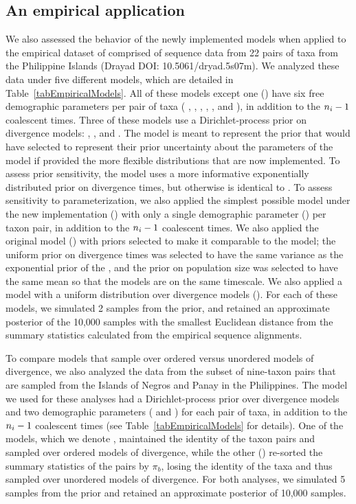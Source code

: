 \subsection*{An empirical application}
We also assessed the behavior of the newly implemented models when applied to
the empirical dataset of \citet{Oaks2012} comprised of sequence data from 22
pairs of taxa from the Philippine Islands (Drayad DOI: 10.5061/dryad.5s07m).
We analyzed these data under five different models, which are detailed in
Table~\ref{tabEmpiricalModels}.
All of these models except one (\empModelDPPSimple) have six free demographic
parameters per pair of taxa (
\ancestralTheta{},
,
,
\bottleTime{},
, and
),
in addition to the $\popSampleSize{i}{} - 1$ coalescent times.
Three of these models use a Dirichlet-process prior on divergence models:
\empModelDPP, \empModelDPPInform, and \empModelDPPSimple.
The \empModelDPP model is meant to represent the prior that \citet{Oaks2012}
would have selected to represent their prior uncertainty about the parameters
of the model if provided the more flexible distributions that are now
implemented.
To assess prior sensitivity, the \empModelDPPInform model uses a more
informative exponentially distributed prior on divergence times, but otherwise
is identical to \empModelDPP.
To assess sensitivity to parameterization, we also applied the simplest
possible model under the new implementation (\empModelDPPSimple) with only a
single demographic parameter (\myTheta{}) per taxon pair, in addition to the
$\popSampleSize{i}{} - 1$ coalescent times.
We also applied the original \msb model (\empModelOld) with priors
selected to make it comparable to the \empModelDPP model;
the uniform prior on divergence times was selected to have the same variance as
the exponential prior of the \empModelDPP, and the prior on population
size was selected to have the same mean so that the models are on the same
timescale.
We also applied a model with a uniform distribution over divergence models
(\empModelUniform).
For each of these models, we simulated 2 samples from the prior, and
retained an approximate posterior of the 10,000 samples with the smallest
Euclidean distance from the summary statistics calculated from the empirical
sequence alignments.

To compare models that sample over ordered versus unordered models of
divergence, we also analyzed the data from the subset of nine-taxon pairs that
are sampled from the Islands of Negros and Panay in the Philippines.
The model we used for these analyses had a Dirichlet-process prior over
divergence models and two demographic parameters (\ancestralTheta{} and
\descendantTheta{}{}) for each pair of taxa, in addition to the
$\popSampleSize{i}{} - 1$ coalescent times (see Table~\ref{tabEmpiricalModels}
for details).
One of the models, which we denote \npModelDPPOrdered, maintained the identity
of the taxon pairs and sampled over ordered models of divergence, while the
other (\npModelDPP) re-sorted the summary statistics of the pairs by $\pi_b$,
losing the identity of the taxa and thus sampled over unordered models of
divergence.
For both analyses, we simulated 5 samples from the prior and retained an
approximate posterior of 10,000 samples.

